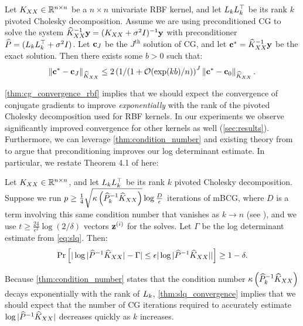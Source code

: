 \begin{theorem}
  \label{thm:cg_convergence_rbf}
  Let $K_{XX} \in \mathbb{R}^{n \times n}$ be a $n \times n$ univariate RBF kernel, and let $L_k L_k^\top$ be its rank $k$ pivoted Cholesky decomposition.
  Assume we are using preconditioned CG to solve the system $\widehat{K}_{XX}^{-1} \mathbf{y} = (K_{XX} + \sigma^2 I)^{-1} \mathbf{y}$ with preconditioner $\widehat{P} = (L_k L_k^\top + \sigma^2 I)$.
  Let $\mathbf{c}_J$ be the $J^\textrm{th}$ solution of CG, and let $\mathbf{c}^{*} = \widehat{K}_{XX}^{-1} \mathbf{y}$ be the exact solution.
  Then there exists some $b > 0$ such that:
  \begin{equation}
    \Vert \bc^{*} - \bc_{J} \Vert_{\trainK}
    \leq 2 \left(1/(1 + \bigo{\exp(kb)/n}\right)^{J} \left\Vert \bc^{*} - \bc_{0} \right\Vert_{\trainK}.
  \end{equation}
\end{theorem}
%
\cref{thm:cg_convergence_rbf} implies that we should expect the convergence of conjugate gradients to improve \emph{exponentially} with the rank of the pivoted Cholesky decomposition used for RBF kernels. In our experiments we observe significantly improved convergence for other kernels as well (\cref{sec:results}). Furthermore, we can leverage \cref{thm:condition_number} and existing theory from \cite{ubaru2017fast} to argue that preconditioning improves our log determinant estimate. In particular, we restate Theorem 4.1 of \citet{ubaru2017fast} here:
\begin{theorem}
  \label{thm:slq_convergence}
  Let $K_{XX} \in \mathbb{R}^{n \times n}$, and let $L_k L_k^\top$ be its rank $k$ pivoted Cholesky decomposition.
  Suppose we run $p \geq \frac{1}{4} \sqrt{ \kappa \left( \widehat{P}_{k}^{-1}\widehat{K}_{XX} \right) } \log \frac{D}{\epsilon}$ iterations of mBCG,
  where $D$ is a term involving this same condition number that vanishes as $k \to n$ (see \cite{ubaru2017fast}),
  and we use $t \geq \frac{24}{\epsilon^{2}}\log(2/\delta)$ vectors $\mathbf{z}^{(i)}$ for the solves.
  Let $\Gamma$ be the log determinant estimate from \eqref{eq:slq}. Then:
  \begin{equation}
    \textrm{Pr}\left[\vert \log \vert \widehat{P}^{-1}\widehat{K}_{XX} \vert - \Gamma \vert \leq \epsilon\vert \log \vert \widehat{P}^{-1}\widehat{K}_{XX} \vert \vert \right] \geq 1 - \delta.
  \end{equation}
\end{theorem}
Because \cref{thm:condition_number} states that the condition number $\kappa \left( \widehat{P}_{k}^{-1}\widehat{K}_{XX} \right)$ decays exponentially with the rank of $L_{k}$, \cref{thm:slq_convergence} implies that we should expect that the number of CG iterations required to accurately estimate $\log \vert \widehat{P}^{-1}\widehat{K}_{XX} \vert$ decreases quickly as $k$ increases.
